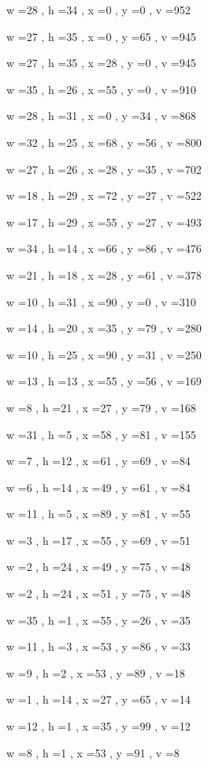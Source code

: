\documentclass[11pt]{article}
\begin{document}
w =28 , h =34 , x =0 , y =0 , v =952
\par
w =27 , h =35 , x =0 , y =65 , v =945
\par
w =27 , h =35 , x =28 , y =0 , v =945
\par
w =35 , h =26 , x =55 , y =0 , v =910
\par
w =28 , h =31 , x =0 , y =34 , v =868
\par
w =32 , h =25 , x =68 , y =56 , v =800
\par
w =27 , h =26 , x =28 , y =35 , v =702
\par
w =18 , h =29 , x =72 , y =27 , v =522
\par
w =17 , h =29 , x =55 , y =27 , v =493
\par
w =34 , h =14 , x =66 , y =86 , v =476
\par
w =21 , h =18 , x =28 , y =61 , v =378
\par
w =10 , h =31 , x =90 , y =0 , v =310
\par
w =14 , h =20 , x =35 , y =79 , v =280
\par
w =10 , h =25 , x =90 , y =31 , v =250
\par
w =13 , h =13 , x =55 , y =56 , v =169
\par
w =8 , h =21 , x =27 , y =79 , v =168
\par
w =31 , h =5 , x =58 , y =81 , v =155
\par
w =7 , h =12 , x =61 , y =69 , v =84
\par
w =6 , h =14 , x =49 , y =61 , v =84
\par
w =11 , h =5 , x =89 , y =81 , v =55
\par
w =3 , h =17 , x =55 , y =69 , v =51
\par
w =2 , h =24 , x =49 , y =75 , v =48
\par
w =2 , h =24 , x =51 , y =75 , v =48
\par
w =35 , h =1 , x =55 , y =26 , v =35
\par
w =11 , h =3 , x =53 , y =86 , v =33
\par
w =9 , h =2 , x =53 , y =89 , v =18
\par
w =1 , h =14 , x =27 , y =65 , v =14
\par
w =12 , h =1 , x =35 , y =99 , v =12
\par
w =8 , h =1 , x =53 , y =91 , v =8
\par
\newpage
\end{document}
